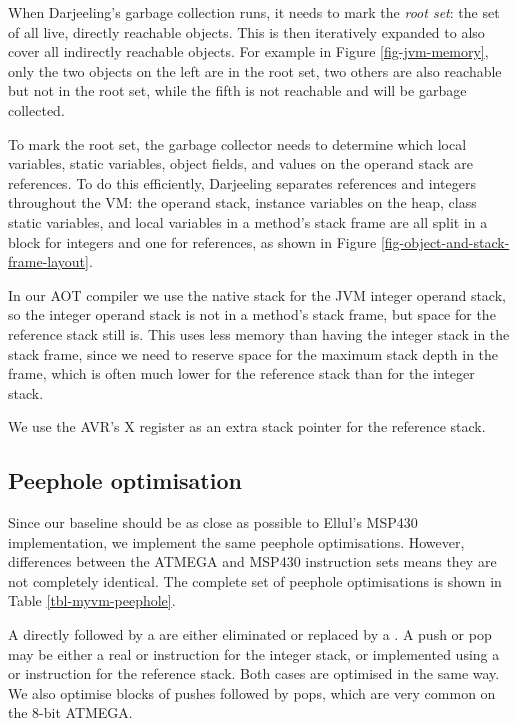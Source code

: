 When Darjeeling's garbage collection runs, it needs to mark the \emph{root set}: the set of all live, directly reachable objects. This is then iteratively expanded to also cover all indirectly reachable objects. For example in Figure \ref{fig-jvm-memory}, only the two objects on the left are in the root set, two others are also reachable but not in the root set, while the fifth is not reachable and will be garbage collected.

To mark the root set, the garbage collector needs to determine which local variables, static variables, object fields, and values on the operand stack are references. To do this efficiently, Darjeeling separates references and integers throughout the VM: the operand stack, instance variables on the heap, class static variables, and local variables in a method's stack frame are all split in a block for integers and one for references, as shown in Figure \ref{fig-object-and-stack-frame-layout}.

In our AOT compiler we use the native stack for the JVM integer operand stack, so the integer operand stack is not in a method's stack frame, but space for the reference stack still is. This uses less memory than having the integer stack in the stack frame, since we need to reserve space for the maximum stack depth in the frame, which is often much lower for the reference stack than for the integer stack.

We use the AVR's X register as an extra stack pointer for the reference stack.

\subsection{Peephole optimisation}
Since our baseline should be as close as possible to Ellul's MSP430 implementation, we implement the same peephole optimisations. However, differences between the ATMEGA and MSP430 instruction sets means they are not completely identical. The complete set of peephole optimisations is shown in Table \ref{tbl-myvm-peephole}.

A  directly followed by a  are either eliminated or replaced by a . A push or pop may be either a real  or  instruction for the integer stack, or implemented using a  or  instruction for the reference stack. Both cases are optimised in the same way. We also optimise blocks of pushes followed by pops, which are very common on the 8-bit ATMEGA. 

